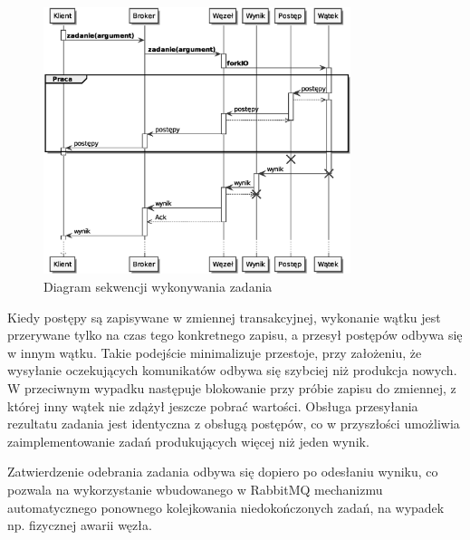 \begin{figure}[h]
  \begin{center}
  \includegraphics[width=0.8\textwidth]{sekwencja}
  \end{center}
\caption{Diagram sekwencji wykonywania zadania}
\label{fig:seq}
\end{figure}
\newpage
Kiedy postępy są zapisywane w zmiennej transakcyjnej, wykonanie wątku jest przerywane tylko na czas tego konkretnego zapisu, a przesył postępów odbywa się w innym wątku. Takie podejście minimalizuje przestoje, przy założeniu, że wysyłanie oczekujących komunikatów odbywa się szybciej niż produkcja nowych. W przeciwnym wypadku następuje blokowanie przy próbie zapisu do zmiennej, z której inny wątek nie zdążył jeszcze pobrać wartości. Obsługa przesyłania rezultatu zadania jest identyczna z obsługą postępów, co w przyszłości umożliwia zaimplementowanie zadań produkujących więcej niż jeden wynik. 

Zatwierdzenie odebrania zadania odbywa się dopiero po odesłaniu wyniku, co pozwala na wykorzystanie wbudowanego w RabbitMQ mechanizmu automatycznego ponownego kolejkowania niedokończonych zadań, na wypadek np. fizycznej awarii węzła.

